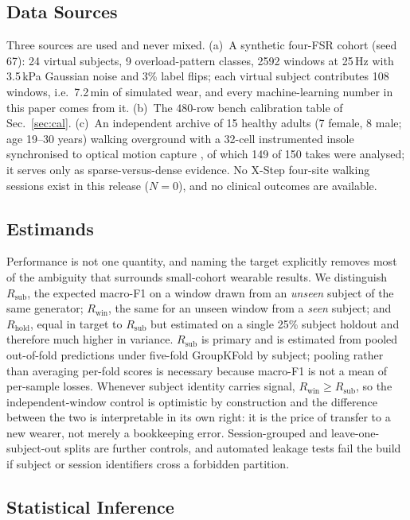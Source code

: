 \documentclass[10pt,conference,a4paper]{IEEEtran}
\begin{document}
\subsection{Data Sources}

Three sources are used and never mixed.
(a)~A synthetic four-FSR cohort (seed 67): 24 virtual subjects, 9
overload-pattern classes, 2592 windows at 25\,Hz with 3.5\,kPa Gaussian noise
and 3\% label flips; each virtual subject contributes 108 windows, i.e.\
7.2\,min of simulated wear, and every machine-learning number in this paper
comes from it.
(b)~The 480-row bench calibration table of Sec.~\ref{sec:cal}.
(c)~An independent archive of 15 healthy adults (7 female, 8 male; age 19--30
years) walking overground with a 32-cell instrumented insole synchronised to
optical motion capture \cite{zenodo2026}, of which 149 of 150 takes were
analysed; it serves only as sparse-versus-dense evidence.
No X-Step four-site walking sessions exist in this release ($N=0$), and no
clinical outcomes are available.

\subsection{Estimands}

Performance is not one quantity, and naming the target explicitly removes most
of the ambiguity that surrounds small-cohort wearable results. We distinguish
$R_{\mathrm{sub}}$, the expected macro-F1 on a window drawn from an
\emph{unseen} subject of the same generator; $R_{\mathrm{win}}$, the same for
an unseen window from a \emph{seen} subject; and $R_{\mathrm{hold}}$, equal in
target to $R_{\mathrm{sub}}$ but estimated on a single 25\% subject holdout and
therefore much higher in variance. $R_{\mathrm{sub}}$ is primary and is
estimated from pooled out-of-fold predictions under five-fold GroupKFold by
subject; pooling rather than averaging per-fold scores is necessary because
macro-F1 is not a mean of per-sample losses. Whenever subject identity carries
signal, $R_{\mathrm{win}}\ge R_{\mathrm{sub}}$, so the independent-window
control is optimistic by construction and the difference between the two is
interpretable in its own right: it is the price of transfer to a new wearer,
not merely a bookkeeping error. Session-grouped and leave-one-subject-out
splits are further controls, and automated leakage tests fail the build if
subject or session identifiers cross a forbidden partition.

\subsection{Statistical Inference}
\label{sec:stats}
\end{document}
